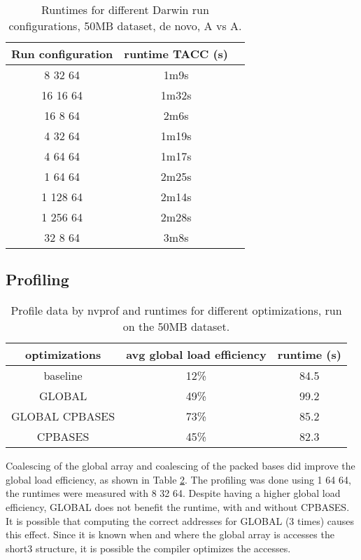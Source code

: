 \documentclass[../thesis.tex]{subfiles}
\begin{document}
\begin{table}
\centering
\caption{Runtimes for different Darwin run configurations, 50MB dataset, de novo, A vs A.}
\label{tbl:darwin6}
\begin{tabular}{c|cc}
Run configuration & runtime TACC (s) \\ \hline
 8 32 64 & 1m9s \\
16 16 64 & 1m32s \\
16  8 64 & 2m6s \\
 4 32 64 & 1m19s \\
 4 64 64 & 1m17s \\
 1 64 64 & 2m25s \\
1 128 64 & 2m14s \\
1 256 64 & 2m28s \\
 32 8 64 & 3m8s \\
\end{tabular}
\end{table}




\newpage



\subsection{Profiling}

\begin{table}
\centering
\caption{Profile data by nvprof and runtimes for different optimizations, run on the 50MB dataset.}
\label{tbl:darwin_prof}
\begin{tabular}{c c c}
optimizations & avg global load efficiency & runtime (s) \\ \hline
baseline & 12\% & 84.5 \\
GLOBAL & 49\% & 99.2 \\
GLOBAL CPBASES & 73\% & 85.2 \\
CPBASES & 45\% & 82.3 \\
\end{tabular}
\end{table}

Coalescing of the global array and coalescing of the packed bases did improve the global load efficiency, as shown in Table \ref{tbl:darwin_prof}.
The profiling was done using 1 64 64, the runtimes were measured with 8 32 64.
Despite having a higher global load efficiency, GLOBAL does not benefit the runtime, with and without CPBASES.
It is possible that computing the correct addresses for GLOBAL (3 times) causes this effect.
Since it is known when and where the global array is accesses the short3 structure, it is possible the compiler optimizes the accesses.
\end{document}

